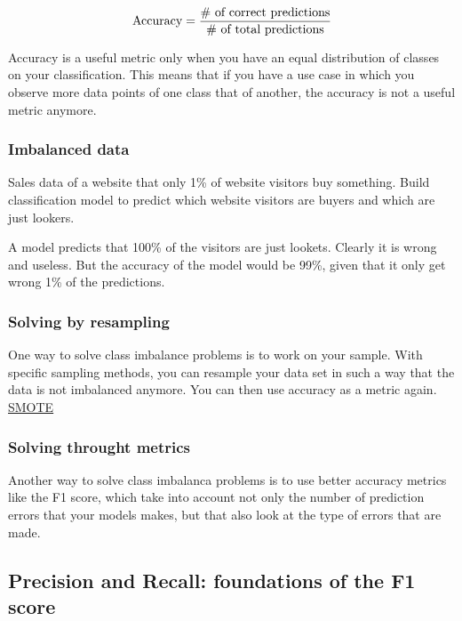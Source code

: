 \begin{align*}
\textnormal{Accuracy} = \frac{\# \textnormal{ of correct predictions}}{\# \textnormal{ of total predictions}}
\end{align*}

Accuracy is a useful metric only when you have an equal distribution of
classes on your classification. This means that if you have a use case
in which you observe more data points of one class that of another, the
accuracy is not a useful metric anymore.

\hypertarget{imbalanced-data}{%
\subsubsection{Imbalanced data}\label{imbalanced-data}}

Sales data of a website that only 1\% of website visitors buy something.
Build classification model to predict which website visitors are buyers
and which are just lookers.

A model predicts that 100\% of the visitors are just lookets. Clearly it
is wrong and useless. But the accuracy of the model would be 99\%, given
that it only get wrong 1\% of the predictions.

\hypertarget{solving-by-resampling}{%
\subsubsection{Solving by resampling}\label{solving-by-resampling}}

One way to solve class imbalance problems is to work on your sample.
With specific sampling methods, you can resample your data set in such a
way that the data is not imbalanced anymore. You can then use accuracy
as a metric again.
\href{https://towardsdatascience.com/smote-fdce2f605729}{SMOTE}

\hypertarget{solving-throught-metrics}{%
\subsubsection{Solving throught
metrics}\label{solving-throught-metrics}}

Another way to solve class imbalanca problems is to use better accuracy
metrics like the F1 score, which take into account not only the number
of prediction errors that your models makes, but that also look at the
type of errors that are made.

\hypertarget{precision-and-recall-foundations-of-the-f1-score}{%
\subsection{Precision and Recall: foundations of the F1
score}\label{precision-and-recall-foundations-of-the-f1-score}}

